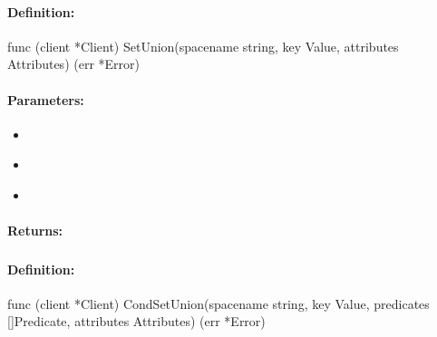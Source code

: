 \paragraph{Definition:}
\begin{gocode}
func (client *Client) SetUnion(spacename string, key Value, attributes Attributes) (err *Error)
\end{gocode}

\paragraph{Parameters:}
\begin{itemize}[noitemsep]
\item {}\\

\item {}\\

\item {}\\

\end{itemize}

\paragraph{Returns:}


\pagebreak
\subsubsection{}
\label{api:Go:CondSetUnion}


\paragraph{Definition:}
\begin{gocode}
func (client *Client) CondSetUnion(spacename string, key Value, predicates []Predicate, attributes Attributes) (err *Error)
\end{gocode}

